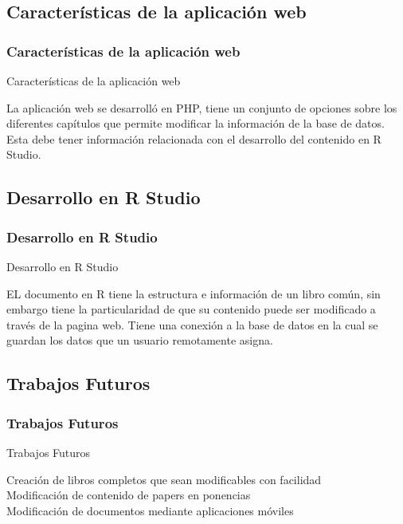\documentclass[11pt]{beamer}					%
\begin{document}
	\subsection{Características de la aplicación web}	
		 \begin{frame}[fragile]	
		 \frametitle{Características de la aplicación web}
		 
		 \begin{block}{Características de la aplicación web}
		 
		La aplicación web se desarrolló en PHP, tiene un conjunto de opciones sobre los diferentes capítulos que permite modificar la información de la base de datos. Esta debe tener información relacionada con el desarrollo del contenido en R Studio.

\end{block}
		
		\end{frame}
		
		
		\subsection{Desarrollo en R Studio}	
		 \begin{frame}[fragile]	
		 \frametitle{Desarrollo en R Studio}
		 
		 \begin{block}{Desarrollo en R Studio}
		 
		EL documento en R tiene la estructura e información de un libro común, sin embargo tiene la particularidad de que su contenido puede ser modificado a través de la pagina web. Tiene una conexión a la base de datos en la cual se guardan los datos que un usuario remotamente asigna.
\end{block}
		
		\end{frame}
	
	\subsection{Trabajos Futuros}	
		 \begin{frame}[fragile]	
		 \frametitle{Trabajos Futuros}
		 
		 \begin{block}{Trabajos Futuros}
		 
Creación de libros completos que sean modificables con facilidad\\
Modificación de contenido de papers en ponencias\\
Modificación de documentos mediante aplicaciones móviles
\end{block}
		
		\end{frame}
	

				
\end{document}
